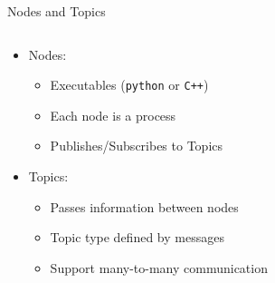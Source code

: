 \documentclass[aspectratio=43]{beamer}
\begin{document}
\begin{frame}{Nodes and Topics}
	\begin{columns}[c]
		\begin{column}{0.6\textwidth}
			\begin{itemize}
				\item Nodes:
					\begin{itemize}
					\item Executables (\texttt{python} or \texttt{C++})
					\item Each node is a process
					\item Publishes/Subscribes to Topics
					\end{itemize}
				\item Topics:
					\begin{itemize}
					\item Passes information between nodes
					\item Topic type defined by messages
					\item Support many-to-many communication
					\end{itemize}
			\end{itemize}
		\end{column}
		\begin{column}{0.4\textwidth}
		\end{column}
	\end{columns}
\end{frame}
\end{document}
